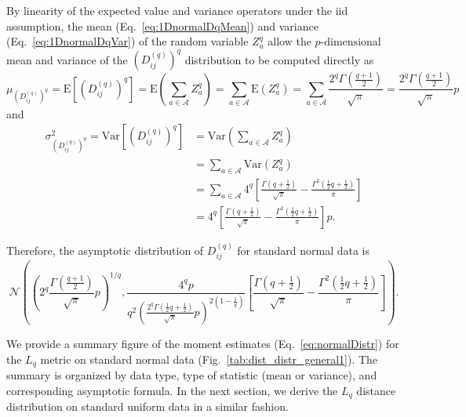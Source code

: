 \documentclass[10pt,letterpaper]{article}
\begin{document}
By linearity of the expected value and variance operators under the iid assumption, the mean (Eq.~\ref{eq:1DnormalDqMean}) and variance (Eq.~\ref{eq:1DnormalDqVar}) of the random variable $Z^q_a$ allow the $p\text{-dimensional}$ mean and variance of the $\left(D^{(q)}_{ij}\right)^q$ distribution to be computed directly as
%
\begin{equation}\label{eq:normalDqMean}
\mu_{\left(D^{(q)}_{ij}\right)^q} = \text{E}\left[\left(D^{(q)}_{ij}\right)^q\right] = \text{E}\left(\sum_{a \in \mathcal{A}} Z^q_a\right) = \sum_{a \in \mathcal{A}} \text{E}\left(Z^q_a\right) = \sum_{a \in \mathcal{A}} \frac{2^q \Gamma\left(\frac{q + 1}{2}\right)}{\sqrt{\pi}} = \frac{2^q\Gamma\left(\frac{q + 1}{2}\right)}{\sqrt{\pi}}p
\end{equation}
%
and
%
\begin{equation}\label{eq:normalVar}
\begin{split}
\sigma^2_{\left(D^{(q)}_{ij}\right)^q} = \text{Var}\left[\left(D^{(q)}_{ij}\right)^q\right] &= \text{Var}\left(\sum_{a \in \mathcal{A}} Z^q_a\right) \\
&= \sum_{a \in \mathcal{A}} \text{Var}\left(Z^q_a\right) \\
&= \sum_{a \in \mathcal{A}} 4^{q}\left[\frac{\Gamma\left(q + \frac{1}{2}\right)}{\sqrt{\pi}} - \frac{\Gamma^2\left(\frac{1}{2}q + \frac{1}{2}\right)}{\pi}\right] \\
&= 4^{q}\left[\frac{\Gamma\left(q + \frac{1}{2}\right)}{\sqrt{\pi}} - \frac{\Gamma^2\left(\frac{1}{2}q + \frac{1}{2}\right)}{\pi}\right]p.
\end{split}
\end{equation}

Therefore, the asymptotic distribution of $D^{(q)}_{ij}$ for standard normal data is
%
\begin{equation}\label{eq:normalDistr}
\mathcal{N}\left(\left(2^q\frac{\Gamma\left(\frac{q + 1}{2}\right)}{\sqrt{\pi}}p\right)^{1/q},
\frac{4^q p}{q^2 \left(\frac{2^q \Gamma\left(\frac{1}{2}q + \frac{1}{2}\right)}{\sqrt{\pi}}p\right)^{2\left(1 - \frac{1}{q}\right)}}\left[\frac{\Gamma\left(q + \frac{1}{2}\right)}{\sqrt{\pi}} - \frac{\Gamma^2\left(\frac{1}{2}q + \frac{1}{2}\right)}{\pi}\right]\right).
\end{equation}

We provide a summary figure of the moment estimates (Eq.~\ref{eq:normalDistr}) for the $L_q$ metric on standard normal data (Fig.~\ref{tab:dist_distr_general1}). The summary is organized by data type, type of statistic (mean or variance), and corresponding asymptotic formula. In the next section, we derive the $L_q$ distance distribution on standard uniform data in a similar fashion.
\end{document}
